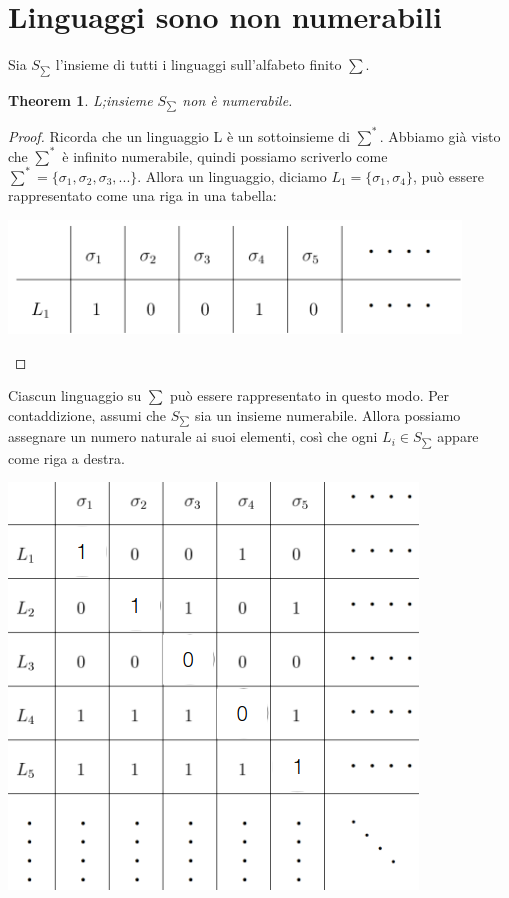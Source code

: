 \documentclass[a4paper, 12pt]{article}
\newtheorem{theorem}{Theorem}[section]
\begin{document}
\section{Linguaggi sono non numerabili}
Sia $S_{\sum}$ l'insieme di tutti i linguaggi sull'alfabeto finito $\sum$.
\begin{theorem}
L;insieme $S_{\sum}$ non \`e numerabile.
\end{theorem}
\begin{proof}
Ricorda che un linguaggio L \`e un sottoinsieme di $\sum^*$. Abbiamo gi\`a visto che $\sum^*$ \`e infinito numerabile, quindi possiamo scriverlo come $\sum^* = \{\sigma_1, \sigma_2,\sigma_3,...\}$. Allora un linguaggio, diciamo $L_1 = \{\sigma_1,\sigma_4\}$, pu\`o essere rappresentato come una riga in una tabella:\\
\begin{center}
\includegraphics[scale=0.5]{tabella_linguaggi.png}

\end{center}
\end{proof}
Ciascun linguaggio su $\sum$ pu\`o essere rappresentato in questo modo. Per contaddizione, assumi che $S_{\sum}$ sia un insieme numerabile. Allora possiamo assegnare un numero naturale ai suoi elementi, cos\`i che ogni $L_i \in S_{\sum}$ appare come riga a destra.\\ \begin{center}
\includegraphics[scale=0.5]{tabella_linguaggi2.png}
\end{center}
\end{document}
